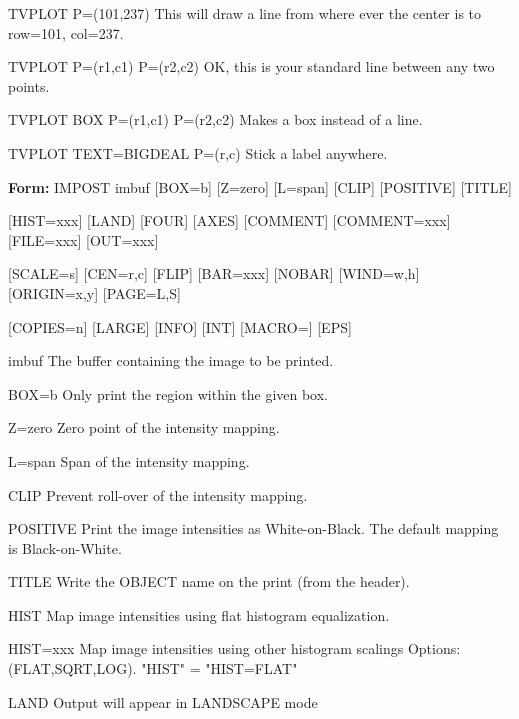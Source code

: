 {\newpage\clearpage
{}%
\begin{example}
  \item[TVPLOT P=(101,237)\hfill]{This will draw a line from where ever
       the center is to row=101, col=237.}
  \item[TVPLOT P=(r1,c1) P=(r2,c2)\hfill]{OK, this is your standard line
       between any two points.}
  \item[TVPLOT BOX P=(r1,c1) P=(r2,c2)\hfill]{Makes a box instead of a line.}
  \item[TVPLOT TEXT=BIGDEAL P=(r,c)\hfill]{Stick a label anywhere.}
\end{example}%
\lthtmlfigureZ
\lthtmlcheckvsize\clearpage}

{\newpage\clearpage
{}%
\begin{command}
  \item[\textbf{Form: } IMPOST imbuf {[BOX=b]} {[Z=zero]} {[L=span]} {[CLIP]} 
       {[POSITIVE]} {[TITLE]}\hfill]{}
  \item[{[HIST=xxx]} {[LAND]} {[FOUR]} {[AXES]} {[COMMENT]} {[COMMENT=xxx]}
        {[FILE=xxx]} {[OUT=xxx]}]{}
  \item[{[SCALE=s]} {[CEN=r,c]} {[FLIP]} {[BAR=xxx]} {[NOBAR]} {[WIND=w,h]} 
        {[ORIGIN=x,y]} {[PAGE=L,S]}]{}
  \item[{[COPIES=n]} {[LARGE]} {[INFO]} {[INT]} {[MACRO=]} {[EPS]}]{}
  \item[imbuf]{The buffer containing the image to be printed.}
  \item[BOX=b]{Only print the region within the given box.}
  \item[Z=zero ]{Zero point of the intensity mapping.}
  \item[L=span ]{Span of the intensity mapping.  }
  \item[CLIP]{Prevent roll-over of the intensity mapping.}
  \item[POSITIVE ]{Print the image intensities as White-on-Black.
                   The default mapping is Black-on-White.}
  \item[TITLE ]{Write the OBJECT name on the print (from the header).}
  \item[HIST ]{Map image intensities using flat histogram equalization.}
  \item[HIST=xxx]{Map image intensities using other histogram scalings
                  Options: (FLAT,SQRT,LOG).  "HIST" = "HIST=FLAT"}
  \item[LAND ]{Output will appear in LANDSCAPE mode}

\end{command}}
